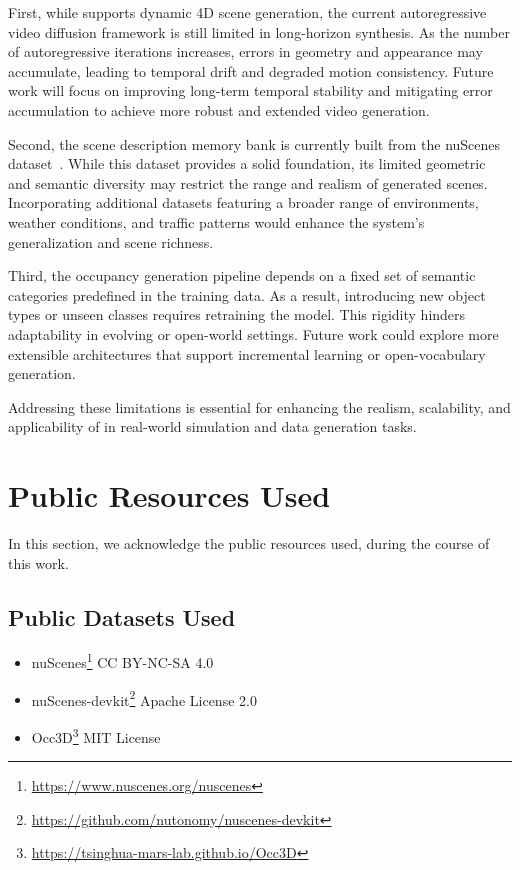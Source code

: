 First, while {\method} supports dynamic 4D scene generation, the current autoregressive video diffusion framework is still limited in long-horizon synthesis. As the number of autoregressive iterations increases, errors in geometry and appearance may accumulate, leading to temporal drift and degraded motion consistency. Future work will focus on improving long-term temporal stability and mitigating error accumulation to achieve more robust and extended video generation.

Second, the scene description memory bank is currently built from the nuScenes dataset~\cite{nuScenes}. While this dataset provides a solid foundation, its limited geometric and semantic diversity may restrict the range and realism of generated scenes. Incorporating additional datasets featuring a broader range of environments, weather conditions, and traffic patterns would enhance the system’s generalization and scene richness.

Third, the occupancy generation pipeline depends on a fixed set of semantic categories predefined in the training data. As a result, introducing new object types or unseen classes requires retraining the model. This rigidity hinders adaptability in evolving or open-world settings. Future work could explore more extensible architectures that support incremental learning or open-vocabulary generation.

Addressing these limitations is essential for enhancing the realism, scalability, and applicability of {\method} in real-world simulation and data generation tasks.

\section{Public Resources Used}
In this section, we acknowledge the public resources used, during the course of this work.

\subsection{Public Datasets Used}
\begin{itemize}
    \item nuScenes\footnote{\url{https://www.nuscenes.org/nuscenes}} \dotfill CC BY-NC-SA 4.0
    
    \item nuScenes-devkit\footnote{\url{https://github.com/nutonomy/nuscenes-devkit}} \dotfill Apache License 2.0

    \item Occ3D\footnote{\url{https://tsinghua-mars-lab.github.io/Occ3D}} \dotfill MIT License
\end{itemize}


